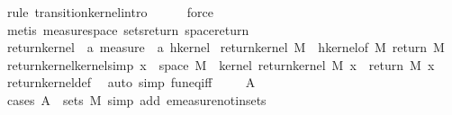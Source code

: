 \begin{isabellebody}
\endisadelimproof
%
\isatagproof
{}\isamarkupfalse%
\ {\isacharparenleft}{\kern0pt}rule\ transition{\isacharunderscore}{\kern0pt}kernel{\isachardot}{\kern0pt}intro{\isacharparenright}{\kern0pt}\isanewline
\ \ \ \ \isamarkupfalse%
\ force\isanewline
\ \ \isamarkupfalse%
\ {\isacharparenleft}{\kern0pt}metis\ measure{\isacharunderscore}{\kern0pt}space\ sets{\isacharunderscore}{\kern0pt}return\ space{\isacharunderscore}{\kern0pt}return{\isacharparenright}{\kern0pt}\isanewline
\ \ \isamarkupfalse%
%
\endisatagproof
{\isafoldproof}%
%
\isadelimproof
\isanewline
%
\endisadelimproof
\isanewline
{}\isamarkupfalse%
\ return{\isacharunderscore}{\kern0pt}kernel\ {\isacharcolon}{\kern0pt}{\isacharcolon}{\kern0pt}\ {\isachardoublequoteopen}{\isacharprime}{\kern0pt}a\ measure\ {\isasymRightarrow}\ {\isacharprime}{\kern0pt}a\ hkernel{\isachardoublequoteclose}\ \isanewline
{\isachardoublequoteopen}return{\isacharunderscore}{\kern0pt}kernel\ M\ {\isacharequal}{\kern0pt}\ hkernel{\isacharunderscore}{\kern0pt}of\ M\ {\isacharparenleft}{\kern0pt}return\ M{\isacharparenright}{\kern0pt}{\isachardoublequoteclose}\isanewline
\isanewline
{}\isamarkupfalse%
\ return{\isacharunderscore}{\kern0pt}kernel{\isacharunderscore}{\kern0pt}kernel{\isacharbrackleft}{\kern0pt}simp{\isacharbrackright}{\kern0pt}{\isacharcolon}{\kern0pt}\ {\isachardoublequoteopen}x\ {\isasymin}\ space\ M\ {\isasymLongrightarrow}\ kernel\ {\isacharparenleft}{\kern0pt}return{\isacharunderscore}{\kern0pt}kernel\ M{\isacharparenright}{\kern0pt}\ x\ {\isacharequal}{\kern0pt}\ return\ M\ x{\isachardoublequoteclose}\isanewline
%
\isadelimproof
\ \ %
\endisadelimproof
%
\isatagproof
{}\isamarkupfalse%
\ return{\isacharunderscore}{\kern0pt}kernel{\isacharunderscore}{\kern0pt}def\ \isamarkupfalse%
\ {\isacharparenleft}{\kern0pt}auto\ simp{\isacharcolon}{\kern0pt}\ fun{\isacharunderscore}{\kern0pt}eq{\isacharunderscore}{\kern0pt}iff{\isacharparenright}{\kern0pt}\isanewline
\ \ \isamarkupfalse%
\ \ A{\isacharprime}{\kern0pt}\ \isanewline
\ \ \ \ \isamarkupfalse%
\ {\isacharparenleft}{\kern0pt}cases\ {\isachardoublequoteopen}A{\isacharprime}{\kern0pt}\ {\isasymin}\ sets\ M{\isachardoublequoteclose}{\isacharsemicolon}{\kern0pt}\ simp\ add{\isacharcolon}{\kern0pt}\ emeasure{\isacharunderscore}{\kern0pt}notin{\isacharunderscore}{\kern0pt}sets{\isacharparenright}{\kern0pt}\isanewline
\ \ \isamarkupfalse%

\end{isabellebody}

